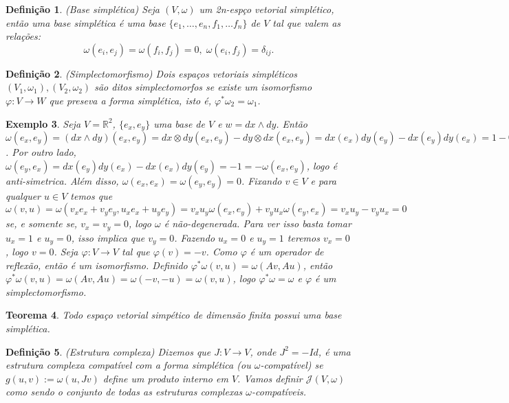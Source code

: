 \documentclass[12pt]{book}
\newtheorem{teorema}{Teorema}[section]
\newtheorem{definicao}[teorema]{Definição}
\newtheorem{exemplo}[teorema]{Exemplo}
\newcommand{\estruturascomplexaspadrao}{\mathcal{J}(V, \omega)}
\newcommand{\real}[1]{\mathbb{R}^{#1}}
\newcommand{\vermelho}[1]{{\color{red}#1}}
\begin{document}
	\begin{definicao}
		(Base simplética) Seja $(V, \omega)$ um 2n-espço vetorial simplético, então uma base simplética é uma base $\{ e_{1},\dots, e_{n},f_{1},\dots f_{n}\}$ de $V$ tal que valem as relações:
		$$
		\omega(e_{i}, e_{j}) = \omega(f_{i}, f_{j}) = 0, \; \omega(e_{i}, f_{j}) = \delta_{ij}.
		$$
	\end{definicao}
	
	\begin{definicao}
		(Simplectomorfismo) Dois espaços vetoriais simpléticos $(V_{1}, \omega_{1}), (V_{2}, \omega_{2})$ são ditos simplectomorfos se existe um isomorfismo $\varphi:V\to W$ que preseva a forma simplética, isto é, $\varphi^{*}\omega_{2} = \omega_{1}$.
	\end{definicao}
	\begin{exemplo}
		Seja $V = \real{2}$, $\{e_{x}, e_{y}\}$ uma base de $V$ e $w=dx \wedge dy$. Então $\omega(e_{x}, e_{y}) = (dx \wedge dy)(e_{x}, e_{y}) = dx\otimes dy(e_{x}, e_{y})-dy\otimes dx(e_{x}, e_{y}) =dx(e_{x}) dy(e_{y}) - dx(e_{y}) dy(e_{x}) = 1-0= 1$. Por outro lado, $\omega(e_{y}, e_{x}) =dx(e_{y}) dy(e_{x}) - dx(e_{x}) dy(e_{y}) =-1 =-\omega(e_{x}, e_{y})$, logo é anti-simetrica. Além disso, $\omega(e_{x}, e_{x}) = \omega(e_{y}, e_{y}) = 0$. Fixando $v \in V$ e para qualquer $u \in V$ temos que $\omega(v, u) = \omega(v_{x}e_{x}+v_{y}e_{y}, u_{x}e_{x}+u_{y}e_{y}) = v_{x}u_{y}\omega(e_{x}, e_{y}) +v_{y}u_{x}\omega(e_{y}, e_{x}) = v_{x}u_{y} -v_{y}u_{x} = 0$ se, e somente se, $v_{x}=v_{y}=0$, logo $\omega$ é não-degenerada. Para ver isso basta tomar $u_{x} = 1$ e $u_{y} = 0$, isso implica que $v_{y} = 0$. Fazendo $u_{x} = 0$ e $u_{y} = 1$ teremos $v_{x} = 0$, logo $v=0$. Seja $\varphi:V \to V$ tal que $\varphi(v) = -v$. Como $\varphi$ é um operador de reflexão, então é um isomorfismo. Definido $\varphi^{*}\omega(v, u) = \omega(Av, Au)$, então $\varphi^{*}\omega(v, u) = \omega(Av, Au)=\omega(-v, -u)=\omega(v, u)$, logo $\varphi^{*}\omega = \omega$ e $\varphi$ é um simplectomorfismo.
	\end{exemplo}
	
	\begin{teorema}
		\vermelho{Todo espaço vetorial simpético de dimensão finita possui uma base simplética.}
	\end{teorema}
	
	
	\begin{definicao}\label{definicao_estrutura_complexa}
		(Estrutura complexa) Dizemos que $J: V \to V$, onde $J^{2} = -Id$, é uma estrutura complexa compatível com a forma simplética (ou $\omega$-compatível) se $g(u,v):=\omega(u, Jv)$ define um produto interno em $V$. Vamos definir $\estruturascomplexaspadrao$ como sendo o conjunto de todas as estruturas complexas $\omega$-compatíveis.
	\end{definicao}
	
\end{document}
